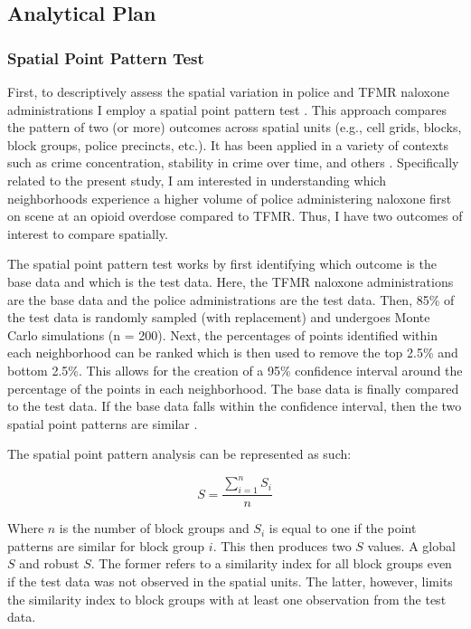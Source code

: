 \subsection{Analytical Plan}
\subsubsection{Spatial Point Pattern Test}

First, to descriptively assess the spatial variation in police and TFMR naloxone administrations I employ a spatial point pattern test \parencite{andresen_testing_2009}. This approach compares the pattern of two (or more) outcomes across spatial units (e.g., cell grids, blocks, block groups, police precincts, etc.). It has been applied in a variety of contexts such as crime concentration, stability in crime over time, and others \parencite{andresen_crime_2017, ha_spatial_2020, ratcliffe_detecting_2005}. Specifically related to the present study, I am interested in understanding which neighborhoods experience a higher volume of police administering naloxone first on scene at an opioid overdose compared to TFMR. Thus, I have two outcomes of interest to compare spatially. 

The spatial point pattern test works by first identifying which outcome is the base data and which is the test data. Here, the TFMR naloxone administrations are the base data and the police administrations are the test data. Then, 85\% of the test data is randomly sampled (with replacement) and undergoes Monte Carlo simulations (n = 200). Next, the percentages of points identified within each neighborhood can be ranked which is then used to remove the top 2.5\% and bottom 2.5\%. This allows for the creation of a 95\% confidence interval around the percentage of the points in each neighborhood. The base data is finally compared to the test data. If the base data falls within the confidence interval, then the two spatial point patterns are similar \parencite{andresen_testing_2009}.

The spatial point pattern analysis can be represented as such:

\[
    S = \frac{\sum_{i=1}^n S_i}{n}
\]

\noindent Where \(n\) is the number of block groups and \(S_i\) is equal to one if the point patterns are similar for block group \(i\). This then produces two \(S\) values. A global \(S\) and robust \(S\). The former refers to a similarity index for all block groups even if the test data was not observed in the spatial units. The latter, however, limits the similarity index to block groups with at least one observation from the test data. 

